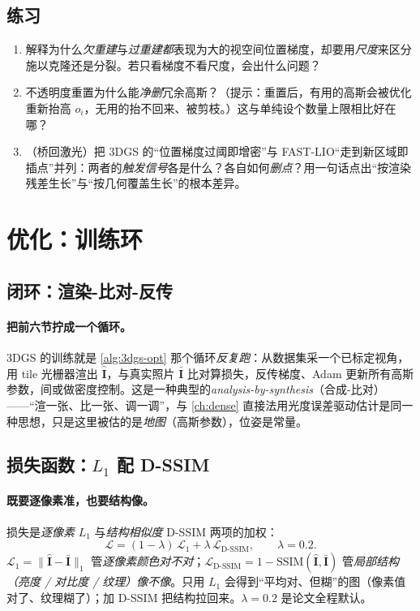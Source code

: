 \subsection*{练习}
\begin{enumerate}
  \item 解释为什么\emph{欠重建}与\emph{过重建}\emph{都}表现为大的视空间位置梯度，却要用\emph{尺度}来区分施以克隆还是分裂。若只看梯度不看尺度，会出什么问题？
  \item 不透明度重置为什么能\emph{净删}冗余高斯？（提示：重置后，有用的高斯会被优化重新抬高 $o_i$，无用的抬不回来、被剪枝。）这与单纯设个数量上限相比好在哪？
  \item （桥回激光）把 3DGS 的“位置梯度过阈即增密”与 FAST-LIO“走到新区域即插点”并列：两者的\emph{触发信号}各是什么？各自如何\emph{删点}？用一句话点出“按渲染残差生长”与“按几何覆盖生长”的根本差异。
\end{enumerate}

\section{优化：训练环}
\label{sec:3dgs-opt}

\subsection{闭环：渲染-比对-反传}

\paragraph{把前六节拧成一个循环。}
3DGS 的训练就是 \cref{alg:3dgs-opt} 那个循环\emph{反复跑}：从数据集采一个已标定视角，用 tile 光栅器渲出 $\hat{\mathbf I}$，与真实照片 $\bar{\mathbf I}$ 比对算损失，反传梯度、Adam 更新所有高斯参数，间或做密度控制。这是一种典型的\emph{analysis-by-synthesis}（合成-比对）——“渲一张、比一张、调一调”，与 \cref{ch:dense} 直接法用光度误差驱动估计是同一种思想，只是这里被估的是\emph{地图}（高斯参数），位姿是常量。

\subsection{损失函数：$L_1$ 配 D-SSIM}

\paragraph{既要逐像素准，也要结构像。}
损失是\emph{逐像素} $L_1$ 与\emph{结构相似度} D-SSIM 两项的加权：
\begin{equation}
  \mathcal L=(1-\lambda)\,\mathcal L_1+\lambda\,\mathcal L_{\mathrm{D\text{-}SSIM}},\qquad \lambda=0.2.
  \label{eq:3dgs-loss}
\end{equation}
$\mathcal L_1=\lVert\hat{\mathbf I}-\bar{\mathbf I}\rVert_1$ 管\emph{逐像素颜色对不对}；$\mathcal L_{\mathrm{D\text{-}SSIM}}=1-\mathrm{SSIM}(\hat{\mathbf I},\bar{\mathbf I})$ 管\emph{局部结构（亮度 / 对比度 / 纹理）像不像}。只用 $L_1$ 会得到“平均对、但糊”的图（像素值对了、纹理糊了）；加 D-SSIM 把结构拉回来。$\lambda=0.2$ 是论文全程默认。

